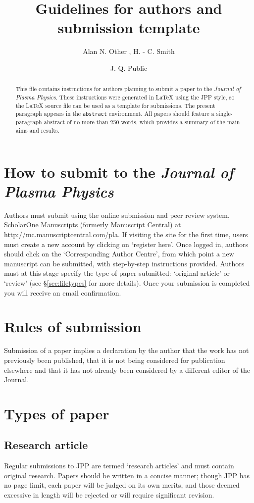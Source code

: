 \documentclass{jpp}
\title{Guidelines for authors and submission template}
\author{Alan N. Other\aff{1}
  \corresp{\email{jpp@damtp.cam.ac.uk}},
  H. - C. Smith\aff{1}
 \and J. Q.  Public\aff{2}}
\affiliation{\aff{1}Plasma Physics Laboratory, University of America,
Somewhere, IN 12345, USA
\aff{2}Department of Physics, University of
Camford, Academic Street, Camford CF3 5QL, UK}
\begin{document}
\maketitle

\begin{abstract}
This file contains instructions for authors planning to submit a paper to the \textit{Journal of Plasma Physics}. These instructions were generated in {\LaTeX} using the JPP style, so the {\LaTeX} source file can be used as a template for submissions. The present paragraph appears in the \verb|abstract| environment. All papers should feature a single-paragraph abstract of no more than 250 words, which provides a summary of the main aims and results.
\end{abstract}



\section{How to submit to the \textbf{\textit{Journal of Plasma Physics}}}
Authors must submit using the online submission and peer review system, ScholarOne Manuscripts (formerly Manuscript Central) at http://mc.manuscriptcentral.com/pla. If visiting the site for the first time, users must create a new account by clicking on `register here'. Once logged in, authors should click on the `Corresponding Author Centre', from which point a new manuscript can be submitted, with step-by-step instructions provided. Authors must at this stage specify the type of paper submitted: `original article' or `review' (see \S\ref{sec:filetypes} for more details). Once your submission is completed you will receive an email confirmation.
 
\section{Rules of submission}\label{sec:rules_submission}
Submission of a paper implies a declaration by the author that the work has not previously been published, that it is not being considered for publication elsewhere and that it has not already been considered by a different editor of the Journal.

\section{Types of paper}\label{sec:types_paper}
\subsection{Research article}
Regular submissions to JPP are termed `research articles' and must contain original research. Papers should be written in a concise manner; though JPP has no page limit, each paper will be judged on its own merits, and those deemed excessive in length will be rejected or will require significant revision.
\end{document}
